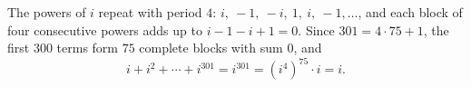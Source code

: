 The powers of $i$ repeat with period $4$: $i,\ -1,\ -i,\ 1,\ i,\ -1,\dots$, and each block of four consecutive powers adds up to $i-1-i+1=0$. Since $301=4\cdot75+1$, the first $300$ terms form $75$ complete blocks with sum $0$, and
\[i+i^2+\cdots+i^{301}=i^{301}=\left(i^4\right)^{75}\cdot i=\boxed{i}.\]
